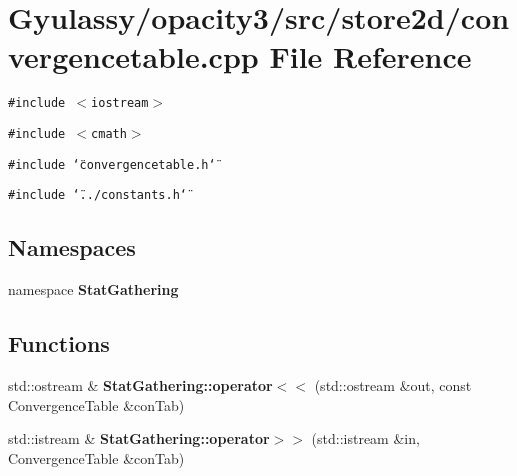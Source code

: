 \section{Gyulassy/opacity3/src/store2d/convergencetable.cpp File Reference}
\label{convergencetable_8cpp}
{\tt \#include $<$iostream$>$}\par
{\tt \#include $<$cmath$>$}\par
{\tt \#include \char`\"{}convergencetable.h\char`\"{}}\par
{\tt \#include \char`\"{}../constants.h\char`\"{}}\par
\subsection*{Namespaces}
\begin{CompactItemize}
\item 
namespace {\bf StatGathering}
\end{CompactItemize}
\subsection*{Functions}
\begin{CompactItemize}
\item 
std::ostream \& {\bf StatGathering::operator$<$$<$} (std::ostream \&out, const ConvergenceTable \&conTab)
\item 
std::istream \& {\bf StatGathering::operator$>$$>$} (std::istream \&in, ConvergenceTable \&conTab)
\end{CompactItemize}
